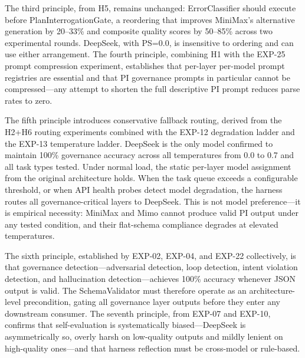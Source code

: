 \documentclass[11pt,a4paper]{article}
\begin{document}
The third principle, from H5, remains unchanged: ErrorClassifier should execute before PlanInterrogationGate, a reordering that improves MiniMax's alternative generation by 20--33\% and composite quality scores by 50--85\% across two experimental rounds. DeepSeek, with PS=0.0, is insensitive to ordering and can use either arrangement. The fourth principle, combining H1 with the EXP-25 prompt compression experiment, establishes that per-layer per-model prompt registries are essential and that PI governance prompts in particular cannot be compressed---any attempt to shorten the full descriptive PI prompt reduces parse rates to zero.

The fifth principle introduces conservative fallback routing, derived from the H2+H6 routing experiments combined with the EXP-12 degradation ladder and the EXP-13 temperature ladder. DeepSeek is the only model confirmed to maintain 100\% governance accuracy across all temperatures from 0.0 to 0.7 and all task types tested. Under normal load, the static per-layer model assignment from the original architecture holds. When the task queue exceeds a configurable threshold, or when API health probes detect model degradation, the harness routes all governance-critical layers to DeepSeek. This is not model preference---it is empirical necessity: MiniMax and Mimo cannot produce valid PI output under any tested condition, and their flat-schema compliance degrades at elevated temperatures.

The sixth principle, established by EXP-02, EXP-04, and EXP-22 collectively, is that governance detection---adversarial detection, loop detection, intent violation detection, and hallucination detection---achieves 100\% accuracy whenever JSON output is valid. The SchemaValidator must therefore operate as an architecture-level precondition, gating all governance layer outputs before they enter any downstream consumer. The seventh principle, from EXP-07 and EXP-10, confirms that self-evaluation is systematically biased---DeepSeek is asymmetrically so, overly harsh on low-quality outputs and mildly lenient on high-quality ones---and that harness reflection must be cross-model or rule-based.
\end{document}
